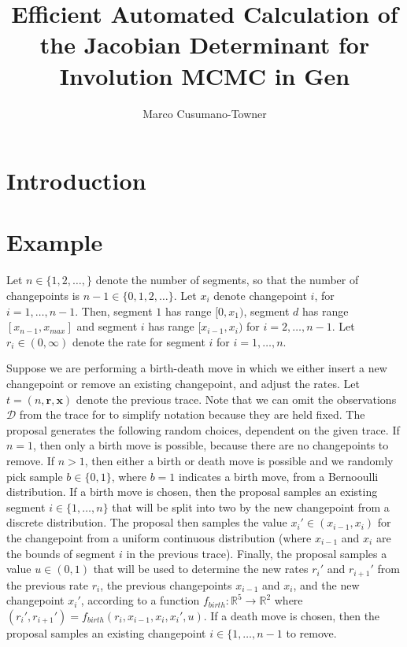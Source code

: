 \documentclass{article}
\title{Efficient Automated Calculation of the Jacobian Determinant for Involution MCMC in Gen}
\author{Marco Cusumano-Towner}
\date{}
\begin{document}
\maketitle

\section{Introduction}

\section{Example}

Let $n \in \{1, 2, \ldots, \}$ denote the number of segments, so that the number of changepoints is $n-1 \in \{0, 1, 2, \ldots\}$.
Let $x_i$ denote changepoint $i$, for $i=1,\ldots,n-1$.
Then, segment $1$ has range $[0, x_1)$, segment $d$ has range $[x_{n-1}, x_{max}]$ and segment $i$ has range $[x_{i-1}, x_i)$ for $i=2,\ldots,n-1$.
Let $r_i \in (0, \infty)$ denote the rate for segment $i$ for $i=1,\ldots,n$.

Suppose we are performing a birth-death move in which we either insert a new changepoint or remove an existing changepoint, and adjust the rates.
Let $t = (n, \mathbf{r}, \mathbf{x})$ denote the previous trace.
Note that we can omit the observations $\mathcal{D}$ from the trace for to simplify notation because they are held fixed.
The proposal generates the following random choices, dependent on the given trace.
If $n = 1$, then only a birth move is possible, because there are no changepoints to remove.
If $n > 1$, then either a birth or death move is possible and we randomly pick sample $b \in \{0, 1\}$, where $b = 1$ indicates a birth move, from a Bernooulli distribution.
If a birth move is chosen, then the proposal samples an existing segment $i \in \{1, \ldots, n\}$ that will be split into two by the new changepoint from a discrete distribution.
The proposal then samples the value $x_i' \in (x_{i-1}, x_i)$ for the changepoint from a uniform continuous distribution (where $x_{i-1}$ and $x_i$ are the bounds of segment $i$ in the previous trace).
Finally, the proposal samples a value $u \in (0, 1)$ that will be used to determine the new rates $r_{i}'$ and $r_{i+1}'$ from the previous rate $r_i$, the previous changepoints $x_{i-1}$ and $x_i$, and the new changepoint $x_i'$, according to a function $f_{birth}: \mathbb{R}^5 \to \mathbb{R}^2$ where $(r_i', r_{i+1}') = f_{birth}(r_i, x_{i-1}, x_i, x_i', u)$.
If a death move is chosen, then the proposal samples an existing changepoint $i \in \{1, \ldots, n-1$ to remove.
\end{document}
